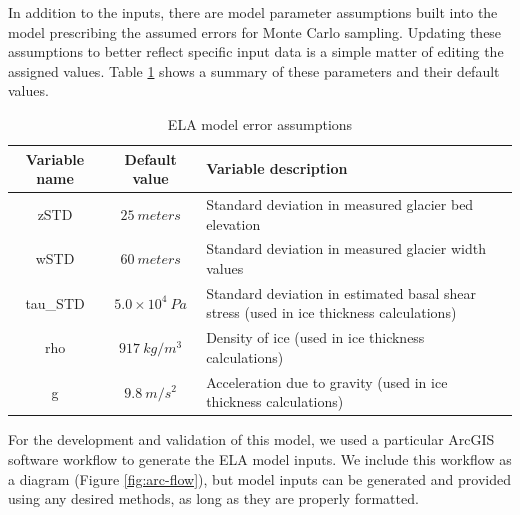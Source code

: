 \documentclass[review]{elsarticle}
\begin{document}
In addition to the inputs, there are model parameter assumptions built into the model prescribing the assumed errors for Monte Carlo sampling.
Updating these assumptions to better reflect specific input data is a simple matter of editing the assigned values.
Table \ref{tab:error} shows a summary of these parameters and their default values.

\begin{table}[]
    \centering
    \begin{tabular}{c|c|p{10cm}}
        Variable name & Default value & Variable description \\
        \hline
        zSTD & $25 \:meters$ & Standard deviation in measured glacier bed elevation \\
        wSTD & $60 \:meters$ & Standard deviation in measured glacier width values \\
        tau\_STD & $5.0 \times 10^4 \:Pa$ & Standard deviation in estimated basal shear stress (used in ice thickness calculations) \\
        rho & $917 \:kg/m^3$ & Density of ice (used in ice thickness calculations) \\
        g & $9.8 \:m/s^2$ & Acceleration due to gravity (used in ice thickness calculations)
    \end{tabular}
    \caption{ELA model error assumptions}
    \label{tab:error}
\end{table}

For the development and validation of this model, we used a particular ArcGIS software workflow to generate the ELA model inputs.
We include this workflow as a diagram (Figure \ref{fig:arc-flow}), but model inputs can be generated and provided using any desired methods, as long as they are properly formatted.
\end{document}
